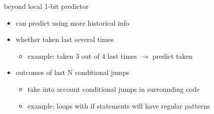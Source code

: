 \begin{frame}{beyond local 1-bit predictor}
    \begin{itemize}
        \item can predict using more historical info
        \vspace{.5cm}
        \item whether taken last several times
            \begin{itemize}
            \item example: taken 3 out of 4 last times $\rightarrow$ predict taken
            \end{itemize}
        \item outcomes of last N conditional jumps
            \begin{itemize}
            \item take into account conditional jumps in surrounding code
            \item example: loops with if statements will have regular patterns
            \end{itemize}
    \end{itemize}
\end{frame}
